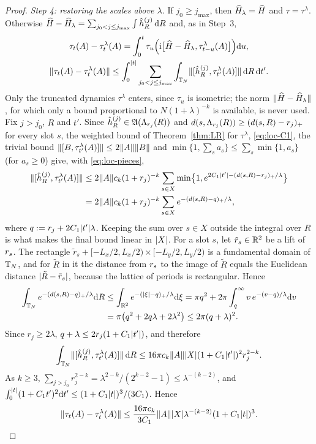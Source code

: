 \begin{proof}
\emph{Step 4: restoring the scales above $\lambda$.} If $j_0\ge j_{\max}$, then $\widehat{H}_\lambda=\widehat{H}$ and
$\tau=\tau^\lambda$. Otherwise $\widehat{H}-\widehat{H}_\lambda=\sum_{j_0<j\le j_{\max}}\int\hat h^{(j)}_R\,\mathrm{d} R$ and, as in Step~3,
\begin{gather*}
\tau_t(A)-\tau^\lambda_t(A)=\int_0^t\tau_u\Bigl(\mathrm{i}\bigl[\widehat{H}-\widehat{H}_\lambda,\tau^\lambda_{t-u}(A)\bigr]\Bigr)\mathrm{d} u,\\
\lVert\tau_t(A)-\tau^\lambda_t(A)\rVert\le\int_0^{\lvert t\rvert}\sum_{j_0<j\le j_{\max}}\int_{\mathbb{T}_N}\lVert[\hat h^{(j)}_R,\tau^\lambda_{t'}(A)]\rVert\,\mathrm{d} R\,\mathrm{d} t'.
\end{gather*}
Only the truncated dynamics $\tau^\lambda$ enters, since $\tau_u$ is isometric; the norm $\lVert\widehat{H}-\widehat{H}_\lambda\rVert$,
for which only a bound proportional to $N(1+\lambda)^{-k}$ is available, is never used. Fix $j>j_0$, $R$ and $t'$. Since
$\hat h^{(j)}_R\in\mathfrak{A}(\Lambda_{r_j}(R))$ and $d(s,\Lambda_{r_j}(R))\ge(d(s,R)-r_j)_{+}$ for every slot $s$, the weighted bound of
Theorem~\ref{thm:LR} for $\tau^\lambda$, \eqref{eq:loc-C1}, the trivial bound $\lVert[B,\tau^\lambda_{t'}(A)]\rVert\le2\lVert A\rVert\lVert B\rVert$
and $\min\{1,\sum_sa_s\}\le\sum_s\min\{1,a_s\}$ (for $a_s\ge0$) give, with \eqref{eq:loc-pieces},
\begin{align*}
\lVert[\hat h^{(j)}_R,\tau^\lambda_{t'}(A)]\rVert&\le2\lVert A\rVert c_k(1+r_j)^{-k}\sum_{s\in X}\min\bigl\{1,e^{2C_1\lvert t'\rvert-(d(s,R)-r_j)_{+}/\lambda}\bigr\}\\
&=2\lVert A\rVert c_k(1+r_j)^{-k}\sum_{s\in X}e^{-(d(s,R)-q)_{+}/\lambda},
\end{align*}
where $q:=r_j+2C_1\lvert t'\rvert\lambda$. Keeping the sum over $s\in X$ outside the integral over $R$ is what makes the
final bound linear in $\lvert X\rvert$. For a slot $s$, let $\tilde r_s\in\mathbb{R}^2$ be a lift of $r_{s}$. The rectangle
$\tilde r_s+[-L_x/2,L_x/2)\times[-L_y/2,L_y/2)$ is a fundamental domain of $\mathbb{T}_N$, and for $\tilde R$ in it the distance
from $r_{s}$ to the image of $\tilde R$ equals the Euclidean distance $\lvert\tilde R-\tilde r_s\rvert$, because the lattice of
periods is rectangular. Hence
\begin{align*}
\int_{\mathbb{T}_N}e^{-(d(s,R)-q)_{+}/\lambda}\mathrm{d} R&\le\int_{\mathbb{R}^2}e^{-(\lvert\xi\rvert-q)_{+}/\lambda}\mathrm{d}\xi
=\pi q^2+2\pi\int_q^\infty v\,e^{-(v-q)/\lambda}\mathrm{d} v\\
&=\pi\bigl(q^2+2q\lambda+2\lambda^2\bigr)\le2\pi(q+\lambda)^2 .
\end{align*}
Since $r_j\ge2\lambda$, $q+\lambda\le2r_j(1+C_1\lvert t'\rvert)$, and therefore
\[
\int_{\mathbb{T}_N}\lVert[\hat h^{(j)}_R,\tau^\lambda_{t'}(A)]\rVert\,\mathrm{d} R\le16\pi c_k\lVert A\rVert\lvert X\rvert(1+C_1\lvert t'\rvert)^2r_j^{2-k}.
\]
As $k\ge3$, $\sum_{j>j_0}r_j^{2-k}=\lambda^{2-k}/(2^{k-2}-1)\le\lambda^{-(k-2)}$, and
$\int_0^{\lvert t\rvert}(1+C_1t')^2\mathrm{d} t'\le(1+C_1\lvert t\rvert)^3/(3C_1)$. Hence
\begin{equation}\label{eq:loc-restore}
\lVert\tau_t(A)-\tau^\lambda_t(A)\rVert\le\frac{16\pi c_k}{3C_1}\lVert A\rVert\lvert X\rvert\lambda^{-(k-2)}(1+C_1\lvert t\rvert)^3 .
\end{equation}


\end{proof}
